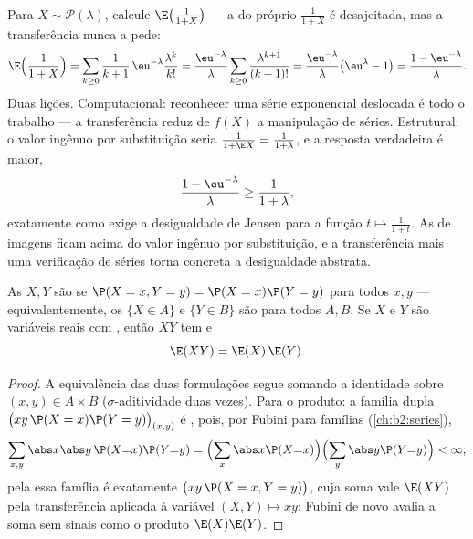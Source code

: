 \begin{example}\label{ex:b2:randomvar:transferex}
Para $X \sim \mathcal P(\lambda)$, calcule
$\E\bigl(\frac1{1+X}\bigr)$ --- a  do próprio $\frac1{1+X}$
é desajeitada, mas a transferência nunca a pede:
\[
\E\Bigl(\frac1{1+X}\Bigr)
= \sum_{k\geq0}\frac{1}{k+1}\,\eu^{-\lambda}
\frac{\lambda^k}{k!}
= \frac{\eu^{-\lambda}}{\lambda}\sum_{k\geq0}
\frac{\lambda^{k+1}}{(k+1)!}
= \frac{\eu^{-\lambda}}{\lambda}\bigl(\eu^\lambda - 1\bigr)
= \frac{1 - \eu^{-\lambda}}{\lambda} .
\]
Duas lições. Computacional: reconhecer uma série exponencial
deslocada é todo o trabalho --- a transferência reduz
 de $f(X)$ a manipulação de séries. Estrutural:
o valor ingênuo por substituição seria $\frac1{1 + \E X} =
\frac1{1 + \lambda}$, e a resposta verdadeira é maior,
\[
\frac{1 - \eu^{-\lambda}}{\lambda} \geq
\frac{1}{1 + \lambda},
\]
exatamente como exige a desigualdade de Jensen para a função  $t
\mapsto \frac1{1+t}$. As  de
imagens  ficam acima do valor ingênuo por substituição, e a transferência
mais uma verificação de séries torna concreta a desigualdade abstrata.
\end{example}

\begin{theorem}\label{thm:b2:randomvar:product}
As  $X, Y$ são \emph{} se $\P(X = x, Y =
y) = \P(X = x)\P(Y = y)$ para todos $x, y$ --- equivalentemente, os
 $\{X \in A\}$ e $\{Y \in B\}$ são  para todos $A,
B$. Se $X$ e $Y$ são variáveis reais  com
, então $XY$ tem  e
\[
\E(XY) = \E(X)\,\E(Y) .
\]
\end{theorem}

\begin{proof}
A equivalência das duas formulações segue somando a identidade
 sobre $(x, y) \in A \times B$
($\sigma$-aditividade duas vezes). Para o produto: a família dupla
$\bigl(xy\,\P(X = x)\P(Y = y)\bigr)_{(x,y)}$ é , pois, por
Fubini para famílias (\cref{ch:b2:series}),
\[
\sum_{x, y}\abs x \abs y\,\P(X{=}x)\P(Y{=}y)
= \Bigl(\sum_x \abs x \P(X{=}x)\Bigr)
\Bigl(\sum_y \abs y \P(Y{=}y)\Bigr) < \infty ;
\]
pela  essa família é exatamente $\bigl(xy\,\P(X = x, Y =
y)\bigr)$, cuja soma vale $\E(XY)$ pela transferência aplicada à
variável $(X, Y) \mapsto xy$; Fubini de novo avalia a soma sem
sinais como o produto $\E(X)\E(Y)$.
\end{proof}

